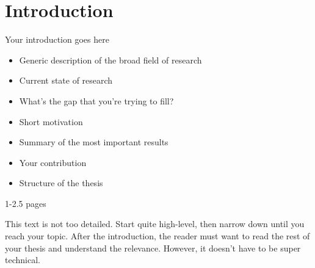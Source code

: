 \chapter{Introduction}
\label{chapter:introduction}
Your introduction goes here
\begin{itemize}
\item Generic description of the broad field of research
\item Current state of research
\item What's the gap that you're trying to fill?
\item Short motivation
\item Summary of the most important results
\item Your contribution
\item Structure of the thesis
\end{itemize}

1-2.5 pages

This text is not too detailed. Start quite high-level, then narrow down until
you reach your topic. After the introduction, the reader must want to read the
rest of your thesis and understand the relevance. However, it doesn't have to
be super technical.
